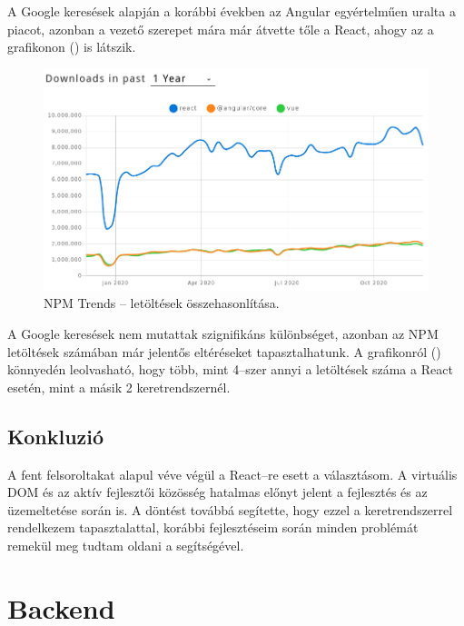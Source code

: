 A Google keresések alapján a korábbi években az Angular egyértelműen uralta a piacot, azonban a vezető szerepet mára már átvette tőle a React, ahogy az a grafikonon () is látszik.

\begin{figure}[!ht]
  \centering
  \includegraphics[width=150mm, keepaspectratio]{figures/npm_trends.png}
  \caption{NPM Trends – letöltések összehasonlítása.}
  \label{fig:NPMTrends}
\end{figure}

A Google keresések nem mutattak szignifikáns különbséget, azonban az NPM letöltések számában már jelentős eltéréseket tapasztalhatunk. A grafikonról () könnyedén leolvasható, hogy több, mint 4–szer annyi a letöltések száma a React esetén, mint a másik 2 keretrendszernél.

\subsection{Konkluzió}
A fent felsoroltakat alapul véve végül a React–re esett a választásom. A virtuális DOM és az aktív fejlesztői közösség hatalmas előnyt jelent a fejlesztés és az üzemeltetése során is. A döntést továbbá segítette, hogy ezzel a keretrendszerrel rendelkezem tapasztalattal, korábbi fejlesztéseim során minden problémát remekül meg tudtam oldani a segítségével.

\section{Backend}

